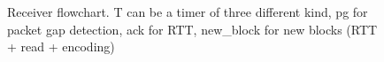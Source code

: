 \begin{figure}[t]
\begin{tikzpicture}[node distance = 2cm]
\end{tikzpicture}
\caption{Receiver flowchart. T can be a timer of three different kind, pg for packet gap detection, ack for RTT, new\_block for new blocks (RTT + read + encoding)}
\label{fig:receiver}
\end{figure}